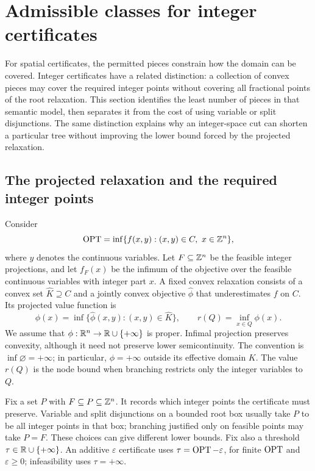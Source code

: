 \section{Admissible classes for integer certificates}
\label{sec:lattice}

For spatial certificates, the permitted pieces constrain how the domain can
be covered. Integer certificates have a related distinction: a collection of
convex pieces may cover the required integer points without covering all
fractional points of the root relaxation. This section identifies the least
number of pieces in that semantic model, then separates it from the cost of
using variable or split disjunctions. The same distinction explains why an
integer-space cut can shorten a particular tree without improving the lower
bound forced by the projected relaxation.

\subsection{The projected relaxation and the required integer points}

Consider
\begin{equation}
 \OPT=\inf\{f(x,y):(x,y)\in C,\ x\in\Z^n\},
 \label{lattice:problem}
\end{equation}
where $y$ denotes the continuous variables. Let $F\subseteq\mathbb{Z}^n$ be the
feasible integer projections, and let $f_F(x)$ be the infimum of the objective
over the feasible continuous variables with integer part $x$. A fixed convex
relaxation consists of a convex set $\widehat K\supseteq C$ and a jointly
convex objective $\widehat\phi$ that underestimates $f$ on $C$. Its projected
value function is
\begin{equation}
 \phi(x)=\inf\{\widehat\phi(x,y):(x,y)\in\widehat K\},
 \qquad r(Q)=\inf_{x\in Q}\phi(x).
 \label{lattice:projection}
\end{equation}
We assume that $\phi:\mathbb{R}^n\to\mathbb{R}\cup\{+\infty\}$ is proper. Infimal
projection preserves convexity, although it need not preserve lower
semicontinuity. The convention is $\inf\varnothing=+\infty$; in particular,
$\phi=+\infty$ outside its effective domain $K$. The value $r(Q)$ is the node
bound when branching restricts only the integer variables to $Q$.

Fix a set $P$ with $F\subseteq P\subseteq\mathbb{Z}^n$. It records which integer
points the certificate must preserve. Variable and split disjunctions on a
bounded root box usually take $P$ to be all integer points in that box;
branching justified only on feasible points may take $P=F$. These choices
can give different lower bounds. Fix also a threshold $\tau\in\mathbb{R}\cup
\{+\infty\}$. An additive $\varepsilon$ certificate uses
$\tau=\operatorname{OPT}-\varepsilon$, for finite $\operatorname{OPT}$ and $\varepsilon\ge0$;
infeasibility uses $\tau=+\infty$.


